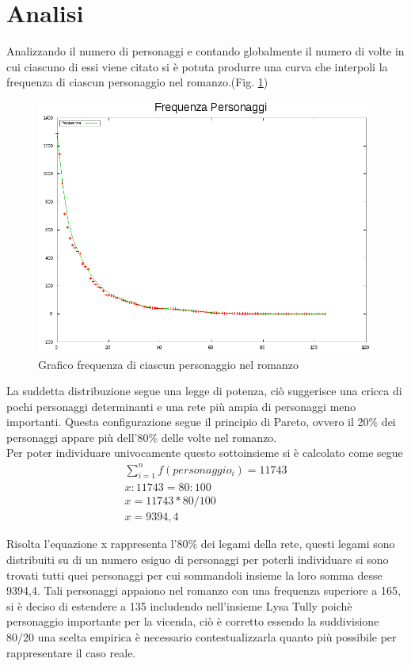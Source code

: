\documentclass[a4paper]{article}
\begin{document}
\section{Analisi}

Analizzando il numero di personaggi e contando globalmente il numero di volte in cui ciascuno di essi viene citato si è potuta produrre una curva che interpoli la frequenza di ciascun personaggio nel romanzo.(Fig. \ref{fig:frequenza-personaggi})

\begin{figure}[h]
\centering
\includegraphics[width=.5\textwidth]{picture/frequenza_personaggi.png}
\caption{Grafico frequenza di ciascun personaggio nel romanzo}
\label{fig:frequenza-personaggi}
\end{figure}

La suddetta distribuzione segue una legge di potenza, ciò suggerisce una cricca di pochi personaggi determinanti e una rete più ampia di personaggi meno importanti. Questa configurazione segue il principio di Pareto, ovvero il 20\% dei personaggi appare più dell'80\% delle volte nel romanzo.\\
Per poter individuare univocamente questo sottoinsieme si è calcolato come segue 
\begin{align}
\sum\limits_{i=1}^n f(personaggio_i ) = 11743\\
x:11743=80:100\nonumber\\
x=11743*80/100\nonumber\\
x=9394,4\nonumber  
\end{align}

Risolta l'equazione x rappresenta l'80\% dei legami della rete, questi legami sono distribuiti su di un numero esiguo di personaggi per poterli individuare si sono trovati tutti quei personaggi per cui sommandoli insieme la loro somma desse 9394,4.
Tali personaggi appaiono nel romanzo con una frequenza superiore a 165, si è deciso di estendere a 135 includendo nell'insieme Lysa Tully poichè personaggio importante per la vicenda, ciò è corretto essendo la suddivisione 80/20 una scelta empirica è necessario contestualizzarla quanto più possibile per rappresentare il caso reale.\\
\end{document}
